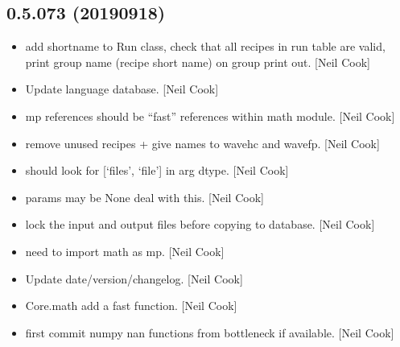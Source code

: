 \documentclass[a4paper,10pt,english]{report}
\begin{document}
\subsection{0.5.073 (2019\sphinxhyphen{}09\sphinxhyphen{}18)}
\label{\detokenize{misc/changelog:id88}}\begin{itemize}
\item {} 
 \sphinxhyphen{} add shortname to Run class,
check that all recipes in run table are valid, print group name
(recipe short name) on group print out. {[}Neil Cook{]}

\item {} 
Update language database. {[}Neil Cook{]}

\item {} 
 \sphinxhyphen{} mp references should be “fast” references within
math module. {[}Neil Cook{]}

\item {} 
 \sphinxhyphen{} remove unused recipes + give names to
wavehc and wavefp. {[}Neil Cook{]}

\item {} 
 \sphinxhyphen{}  should look for {[}‘files’,
‘file’{]} in arg dtype. {[}Neil Cook{]}

\item {} 
 \sphinxhyphen{} params may be None \sphinxhyphen{} deal with this. {[}Neil
Cook{]}

\item {} 
 \sphinxhyphen{} lock the input and output files before copying to
database. {[}Neil Cook{]}

\item {} 
 \sphinxhyphen{} need to import math as mp. {[}Neil
Cook{]}

\item {} 
Update date/version/changelog. {[}Neil Cook{]}

\item {} 
Core.math \sphinxhyphen{} add a fast  function. {[}Neil Cook{]}

\item {} 
 \sphinxhyphen{} first commit numpy nan functions from bottleneck
if available. {[}Neil Cook{]}


\end{itemize}
\end{document}
